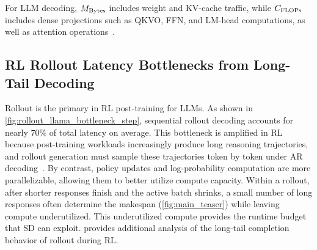For LLM decoding, $M_{\mathrm{Bytes}}$ includes weight and KV-cache traffic, while $C_{\mathrm{FLOPs}}$ includes dense projections such as QKVO, FFN, and LM-head computations, as well as attention operations~\citep{sadhukhan2024magicdec}.


\subsection{RL Rollout Latency Bottlenecks from Long-Tail Decoding}
\label{subsec:rollout_bottleneck}

Rollout is the primary \bottleneck{} in RL post-training for LLMs.
As shown in \cref{fig:rollout_llama_bottleneck_step}, sequential rollout decoding accounts for nearly 70\% of total latency on average.
This bottleneck is amplified in RL because post-training workloads increasingly produce long reasoning trajectories, and rollout generation must sample these trajectories token by token under AR decoding~\citep{gholami2024ai}.
By contrast, policy updates and log-probability computation are more parallelizable, allowing them to better utilize compute capacity.
Within a rollout, after shorter responses finish and the active batch shrinks, a small number of long responses often determine the makespan (\cref{fig:main_teaser}) while leaving compute underutilized.
This underutilized compute provides the runtime budget that SD can exploit.
 provides additional analysis of the long-tail completion behavior of rollout during RL.
